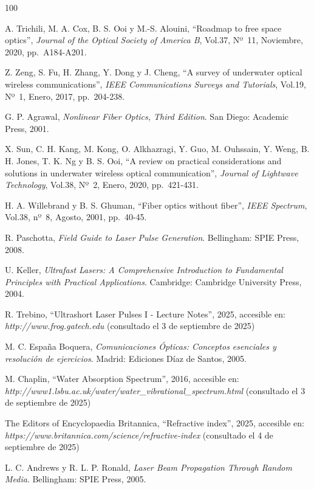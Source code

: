 \begin{thebibliography}{100}

A. Trichili, M. A. Cox, B. S. Ooi y M.-S. Alouini,
``Roadmap to free space optics'',
\textit{Journal of the Optical Society of America B},
Vol.37, Nº~11, Noviembre, 2020, pp.~A184-A201.

Z. Zeng, S. Fu, H. Zhang, Y. Dong y J. Cheng,
``A survey of underwater optical wireless communications'',
\textit{IEEE Communications Surveys and Tutorials},
Vol.19, Nº~1, Enero, 2017, pp.~204-238.

G. P. Agrawal,
\textit{Nonlinear Fiber Optics, Third Edition}.
San Diego: Academic Press, 2001.

X. Sun, C. H. Kang, M. Kong, O. Alkhazragi, Y. Guo, M. Ouhssain, Y. Weng,  
B. H. Jones, T. K. Ng y B. S. Ooi,
``A review on practical considerations and solutions in underwater wireless optical communication'',
\textit{Journal of Lightwave Technology},
Vol.38, Nº~2, Enero, 2020, pp.~421-431.

H. A. Willebrand y B. S. Ghuman,
``Fiber optics without fiber'',
\textit{IEEE Spectrum},
Vol.38, nº~8, Agosto, 2001, pp.~40-45.

R. Paschotta,
\textit{Field Guide to Laser Pulse Generation}.
Bellingham: SPIE Press, 2008.

U. Keller,
\textit{Ultrafast Lasers: A Comprehensive Introduction to Fundamental Principles with Practical Applications}.
Cambridge: Cambridge University Press, 2004.

R. Trebino,
``Ultrashort Laser Pulses I - Lecture Notes'', 2025, accesible en: \textit{http://www.frog.gatech.edu}
(consultado el 3 de septiembre de 2025)

M. C. España Boquera,
\textit{Comunicaciones Ópticas: Conceptos esenciales y resolución de ejercicios}.
Madrid: Ediciones Díaz de Santos, 2005.

M. Chaplin, ``Water Absorption Spectrum'', 2016, accesible en: \textit{http://www1.lsbu.ac.uk/water/water\_vibrational\_spectrum.html} (consultado el 3 de septiembre de 2025)

The Editors of Encyclopaedia Britannica,
``Refractive index'', 2025, accesible en: \textit{https://www.britannica.com/science/refractive-index}
(consultado el 4 de septiembre de 2025)

L. C. Andrews y R. L. P. Ronald,
\textit{Laser Beam Propagation Through Random Media}.
Bellingham: SPIE Press, 2005.


\end{thebibliography}

